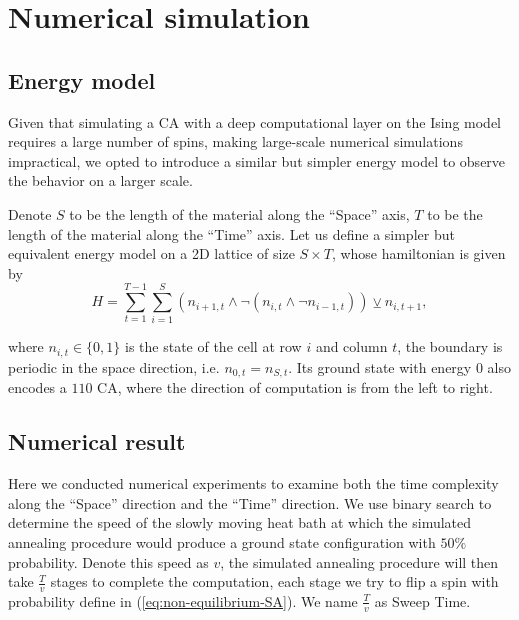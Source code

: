 \documentclass[twocolumn,superscriptaddress,english,showpacs,longbibliography]{revtex4-2}
\begin{document}
\section{Numerical simulation}\label{sec:numerical-result}

\subsection{Energy model}\label{a-2d-surface-programmable-material}

Given that simulating a CA with a deep computational layer on the Ising model requires a large number of spins, making large-scale numerical simulations impractical, we opted to introduce a similar but simpler energy model to observe the behavior on a larger scale.

Denote $S$ to be the length of the material along the ``Space'' axis, $T$
to be the length of the material along the ``Time'' axis. 
Let us define a simpler but equivalent energy model on a 2D lattice of size $S \times T$, whose hamiltonian
is given by
\begin{equation}\label{eq:toy-hamiltonian}
H = \sum_{t=1}^{T-1}\sum_{i=1}^{S} (n_{i+1, t} \land \neg(n_{i, t} \land \neg n_{i-1, t})) \veebar n_{i,t+1},
\end{equation}

where $n_{i, t} \in \{0, 1\}$ is the state of the cell at row $i$ and column $t$, the boundary is periodic in the space direction, i.e. $n_{0, t} = n_{S, t}$.
Its ground state with energy $0$ also encodes a $110$ CA, where the direction of computation is from the left to right.
\subsection{Numerical result}

Here we conducted numerical experiments to examine both the time complexity along the ``Space'' direction and the ``Time'' direction.
We use binary search to determine the speed of the slowly moving heat bath at which
the simulated annealing procedure would produce 
a ground state configuration with $50\%$ probability. Denote this speed 
as $v$, the simulated annealing procedure will then take $\frac{T}{v}$
stages to complete the computation, each stage we try to flip a spin with 
probability define in (\ref{eq:non-equilibrium-SA}). We name $\frac{T}{v}$ 
as Sweep Time.
\end{document}

